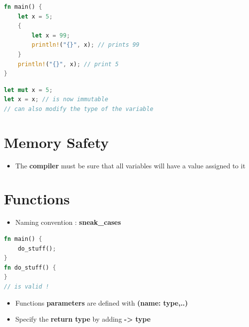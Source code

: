 \documentclass{report}
\begin{document}
\begin{multicols*}{2}
\begin{tcolorbox}[title=Shadowing,colback=backcolour,size=small,left=4mm]
\begin{lstlisting}[language=rust]
fn main() {
	let x = 5;
	{
		let x = 99;
		println!("{}", x); // prints 99
	}
	println!("{}", x); // print 5
}
\end{lstlisting}
\end{tcolorbox}

\begin{tcolorbox}[title=Shadowing in the same scope,colback=backcolour,size=small,left=4mm]
\begin{lstlisting}[language=rust]
let mut x = 5;
let x = x; // is now immutable
// can also modify the type of the variable
\end{lstlisting}
\end{tcolorbox}


\section{Memory Safety}
\begin{itemize}
	\item The \textbf{compiler} must be sure that all variables will have a value assigned to it
\end{itemize}


\section{Functions}

\begin{itemize}
	\item Naming convention : \textbf{sneak\_cases}
\end{itemize}

\begin{tcolorbox}[title=Functions doesn't have to appear before we call them,colback=backcolour,size=small,left=4mm]
\begin{lstlisting}[language=rust]
fn main() {
	do_stuff();
}
fn do_stuff() {
}
// is valid !
\end{lstlisting}
\end{tcolorbox}

\begin{itemize}
	\item Functions \textbf{parameters} are defined with \textbf{(name: type,..)} 
	\item Specify the \textbf{return type} by adding \textbf{-> type}  
\end{itemize}


\end{multicols*}
\end{document}
